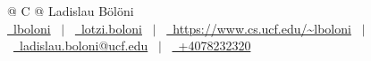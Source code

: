 
\begin{tabularx}{\linewidth}{@{} C @{}}
\Huge{Ladislau Bölöni} \\[7.5pt]
\href{https://github.com/lboloni}{\raisebox{-0.05\height}\faGithub\ lboloni} \ $|$ \ 
\href{https://linkedin.com/in/lotzi-boloni}{\raisebox{-0.05\height}\faLinkedin\ lotzi.boloni} \ $|$ \ 
\href{https://www.cs.ucf.edu/~lboloni/}{\raisebox{-0.05\height}\faGlobe \ https://www.cs.ucf.edu/\textasciitilde{}lboloni} \ $|$ \ 
\href{mailto:ladislau.boloni@ucf.edu}{\raisebox{-0.05\height}\faEnvelope \ ladislau.boloni@ucf.edu} \ $|$ \ 
\href{tel:+14078232320}{\raisebox{-0.05\height}\faMobile \ +4078232320} \\
\end{tabularx}
